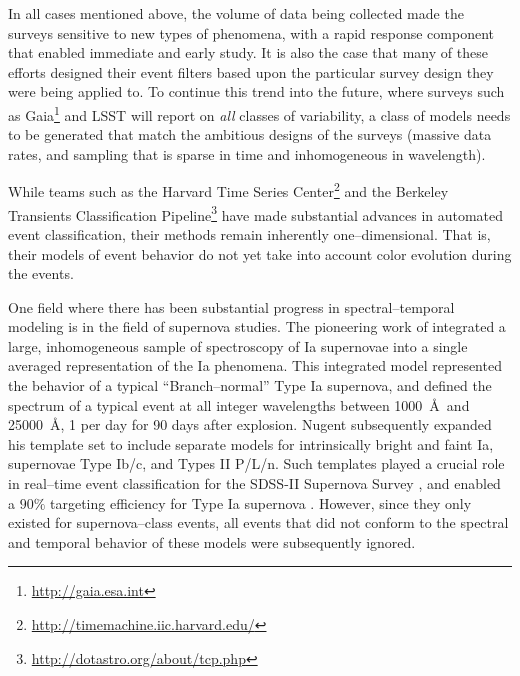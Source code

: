 In all cases mentioned above, the volume of data being collected made the
surveys sensitive to new types of phenomena, with a rapid response component
that enabled immediate and early study.  It is also the case that many of these
efforts designed their event filters based upon the particular survey design
they were being applied to.  To continue this trend into the future, where
surveys such as Gaia\footnote{\url{http://gaia.esa.int}} and LSST will report on
{\it all} classes of variability, a class of models needs to be generated that
match the ambitious designs of the surveys (massive data rates, and sampling
that is sparse in time and inhomogeneous in wavelength).

 \smallskip

While teams such as the Harvard Time Series
Center\footnote{\url{http://timemachine.iic.harvard.edu/}} and the Berkeley
Transients Classification
Pipeline\footnote{\url{http://dotastro.org/about/tcp.php}} have made substantial
advances in automated event classification, their methods remain inherently
one--dimensional. That is, their models of event behavior do not yet take into
account color evolution during the events.

One field where there has been substantial progress in spectral--temporal
modeling is in the field of supernova studies. The pioneering work of
\cite{2002PASP..114..803N} integrated a large, inhomogeneous sample of
spectroscopy of Ia supernovae into a single averaged representation of the Ia
phenomena. This integrated model represented the behavior of a typical
``Branch--normal'' Type Ia supernova, and defined the spectrum of a typical
event at all integer wavelengths between 1000~\AA~and 25000~\AA, 1 per day for
90 days after explosion.  Nugent subsequently expanded his template set to
include separate models for intrinsically bright and faint Ia, supernovae Type
Ib/c, and Types II P/L/n. Such templates played a crucial role in real--time
event classification for the SDSS-II Supernova Survey
\citep{2008AJ....135..338F}, and enabled a $90\%$ targeting efficiency for Type
Ia supernova \citep{2008AJ....135..348S}. However, since they only existed for
supernova--class events, all events that did not conform to the spectral and
temporal behavior of these models were subsequently ignored.

